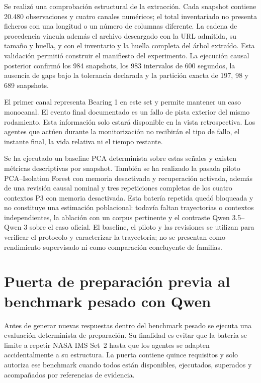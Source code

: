 Se realizó una comprobación estructural de la extracción. Cada snapshot
contiene 20.480 observaciones y cuatro canales numéricos; el total inventariado
no presenta ficheros con una longitud o un número de columnas diferente. La
cadena de procedencia vincula además el archivo descargado con la URL admitida,
su tamaño y huella, y con el inventario y la huella completa del árbol extraído.
Esta validación permitió construir el manifiesto del experimento. La ejecución
causal posterior confirmó los 984 snapshots, los 983 intervalos de 600 segundos,
la ausencia de gaps bajo la tolerancia declarada y la partición exacta de 197,
98 y 689 snapshots.

El primer canal representa Bearing 1 en este set y permite mantener un caso
monocanal. El evento final documentado es un fallo de pista exterior del mismo
rodamiento. Esta información solo estará disponible en la vista retrospectiva.
Los agentes que actúen durante la monitorización no recibirán el tipo de fallo,
el instante final, la vida relativa ni el tiempo restante.

Se ha ejecutado un baseline PCA determinista sobre estas señales y existen
métricas descriptivas por snapshot. También se ha realizado la pasada piloto
PCA--Isolation Forest con memoria desactivada y recuperación activada, además
de una revisión causal nominal y tres repeticiones completas de los cuatro
contextos P3 con memoria desactivada. Esta batería repetida quedó bloqueada y no
constituye una estimación poblacional: todavía faltan trayectorias o contextos
independientes, la ablación con un corpus pertinente y el contraste Qwen
3.5--Qwen 3 sobre el caso oficial. El baseline, el piloto y las revisiones se
utilizan para verificar el protocolo y caracterizar la trayectoria; no se
presentan como rendimiento supervisado ni como comparación concluyente de
familias.

\section{Puerta de preparación previa al benchmark pesado con Qwen}

Antes de generar nuevas respuestas dentro del benchmark pesado se ejecuta una
evaluación determinista de preparación. Su finalidad es evitar que la batería
se limite a repetir NASA IMS Set~2 hasta que los agentes se adapten
accidentalmente a su estructura. La puerta contiene quince requisitos y solo
autoriza ese benchmark cuando todos están disponibles, ejecutados, superados y
acompañados por referencias de evidencia.

